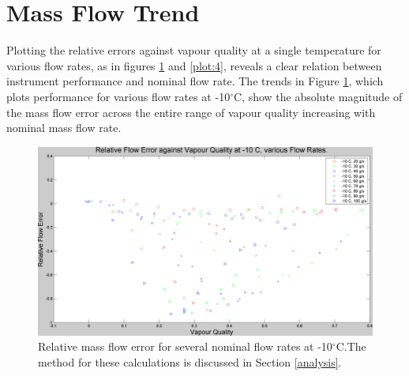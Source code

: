 \documentclass{report}
\begin{document}
\section{Mass Flow Trend}
\FloatBarrier
Plotting the relative errors against vapour quality at a single temperature for various flow rates, as in figures \ref{plot:3} and \ref{plot:4}, reveals a clear relation between instrument performance and nominal flow rate. The trends in Figure \ref{plot:3}, which plots performance for various flow rates at -10$^\circ$C, show the absolute magnitude of the mass flow error across the entire range of vapour quality increasing with nominal mass flow rate. \\ \FloatBarrier
\begin{figure}
\includegraphics[width=\textwidth]{plots/fig3}
\caption{Relative mass flow error for several nominal flow rates at -10$^\circ$C.The method for these calculations is discussed in Section \ref{analysis}.}
\label{plot:3}
\end{figure}
\end{document}
